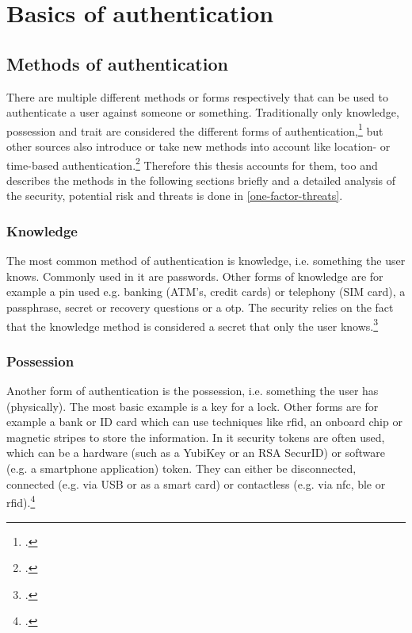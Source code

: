 \chapter{Basics of authentication}
\label{chapter:basics}

\section{Methods of authentication}
There are multiple different methods or forms respectively that can be used to authenticate a user against someone or something. Traditionally only knowledge, possession and trait are considered the different forms of authentication,\footcites[See][299]{10.2307/27845364}[See][140]{brotherston2017defensive}[][47]{anderson2008security} but other sources also introduce or take new methods into account like location- or time-based authentication.\footcites[][]{6296127}[See][191]{dasgupta2017multi} Therefore this thesis accounts for them, too and describes the methods in the following sections briefly and a detailed analysis of the security, potential risk and threats is done in \autoref{one-factor-threats}.

\subsection{Knowledge}

The most common method of authentication is knowledge, i.e. \frqq something the user knows\flqq{}. Commonly used in \gls{it} are passwords. Other forms of knowledge are for example a \gls{pin} used e.g. banking (ATM's, credit cards) or telephony (SIM card), a passphrase, secret or recovery questions or a \gls{otp}. The security relies on the fact that the knowledge method is considered a secret that only the user knows.\footcite[See][467]{eckert-it-sec-9}

\subsection{Possession}

Another form of authentication is the possession, i.e. \frqq something the user has\flqq{} (physically). The most basic example is a key for a lock. Other forms are for example a bank or ID card which can use techniques like \gls{rfid}, an onboard chip or magnetic stripes to store the information. In \gls{it} security tokens are often used, which can be a hardware (such as a YubiKey or an RSA SecurID) or software (e.g. a smartphone application) token. They can either be disconnected, connected (e.g. via USB or as a smart card) or contactless (e.g. via \gls{nfc}, \gls{ble} or \gls{rfid}).\footcites[See][24]{265831}[][]{Dressel:2019:SZT:3319499.3328225}[See][8--11]{1698485}

